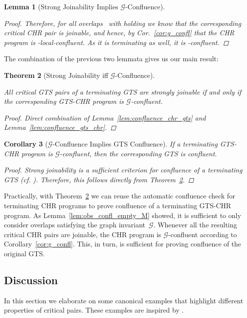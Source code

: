 \documentclass{tlp}
\newtheorem{theorem}{Theorem}\newtheorem{corollary}[theorem]{Corollary}
\newtheorem{lemma}[theorem]{Lemma}
\newcommand{\mcG}{\ensuremath{\mathcal{G}}}
\begin{document}
\begin{lemma}[Strong Joinability Implies
\mcG-Confluence]
\begin{proof}
Therefore, for all overlaps~ with  holding we know that the
corresponding critical CHR pair is joinable, and hence, by Cor.~\ref{cor:g_confl}
that the CHR program is -local-confluent. As it is terminating as
well, it is -confluent.
\end{proof}
\end{lemma}

The combination of the previous two lemmata gives us our main result:

\begin{theorem}[Strong Joinability iff
\mcG-Confluence]\label{thm:confluence_characterization}

All critical GTS pairs of a terminating GTS are strongly joinable if and only if
the corresponding GTS-CHR program is \mcG-confluent.
\begin{proof}
Direct combination of Lemma~\ref{lem:confluence_chr_gts} and
Lemma~\ref{lem:confluence_gts_chr}.
\end{proof}
\end{theorem}

\begin{corollary}[\mcG-Confluence Implies GTS Confluence]

If a terminating GTS-CHR program is \mcG-confluent, then the corresponding GTS is
confluent.
\begin{proof}
Strong joinability is a sufficient criterion for confluence of a terminating
GTS (cf. \cite{plump05}). Therefore, this follows directly from
Theorem~\ref{thm:confluence_characterization}.
\end{proof}
\end{corollary}

Practically, with Theorem~\ref{thm:confluence_characterization} we can reuse the
automatic confluence check for terminating CHR programs
\cite{abdennadherfruehwirthmeuss99,fruehwirth09} to prove confluence of a
terminating GTS-CHR program. As Lemma~\ref{lem:obs_confl_empty_M} showed, it is
sufficient to only consider overlaps satisfying the graph invariant~\mcG.
Whenever all the resulting critical CHR pairs are joinable, the CHR program is
\mcG-confluent according to Corollary~\ref{cor:g_confl}. This, in turn, is
sufficient for proving confluence of the original GTS.

\subsection{Discussion}
\label{sec:confl_discussion}

In this section we elaborate on some canonical examples that highlight different
properties of critical pairs. These examples are inspired by \cite{plump05}.
\end{document}
